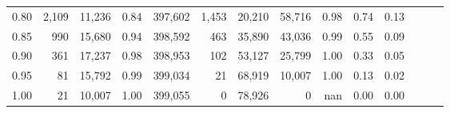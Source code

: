 \begin{tabular}{rrrrrrrrrrrrrr}
0.80 &   2,109 &  11,236 &  0.84 &  397,602 &    1,453 &  20,210 &  58,716 &  0.98 &  0.74 &      0.13 \\
0.85 &     990 &  15,680 &  0.94 &  398,592 &      463 &  35,890 &  43,036 &  0.99 &  0.55 &      0.09 \\
0.90 &     361 &  17,237 &  0.98 &  398,953 &      102 &  53,127 &  25,799 &  1.00 &  0.33 &      0.05 \\
0.95 &      81 &  15,792 &  0.99 &  399,034 &       21 &  68,919 &  10,007 &  1.00 &  0.13 &      0.02 \\
1.00 &      21 &  10,007 &  1.00 &  399,055 &        0 &  78,926 &       0 &   nan &  0.00 &      0.00 \\
\bottomrule
\end{tabular}
